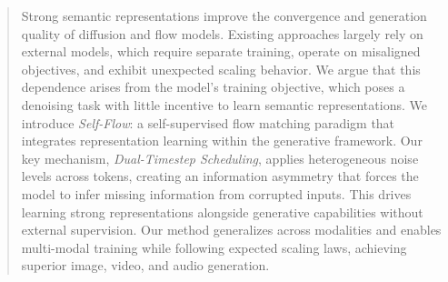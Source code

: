 \begin{abstract}
Strong semantic representations improve the convergence and generation quality of diffusion and flow models. Existing approaches largely rely on external models, which require separate training, operate on misaligned objectives, and exhibit unexpected scaling behavior. We argue that this dependence arises from the model's training objective, which poses a denoising task with little incentive to learn semantic representations. We introduce \emph{Self-Flow}: a self-supervised flow matching paradigm that integrates representation learning within the generative framework. Our key mechanism, \emph{Dual-Timestep Scheduling}, applies heterogeneous noise levels across tokens, creating an information asymmetry that forces the model to infer missing information from corrupted inputs. This drives learning strong representations alongside generative capabilities without external supervision. Our method generalizes across modalities and enables multi-modal training while following expected scaling laws, achieving superior image, video, and audio generation.
\end{abstract}